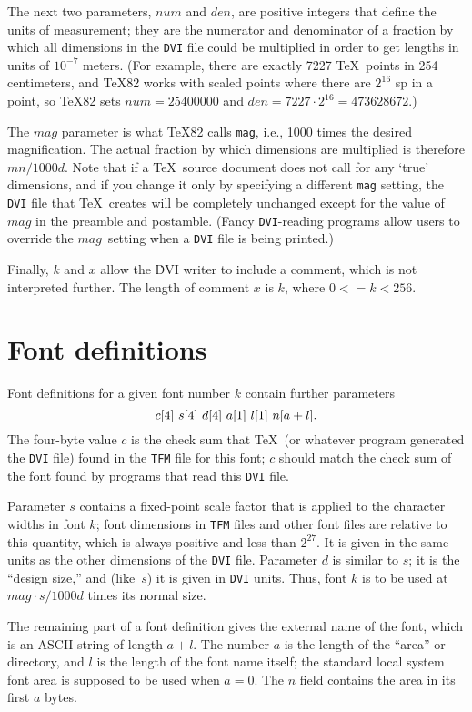 \documentclass[10pt, a4paper]{article}
\begin{document}
The next two parameters, $num$ and $den$, are positive integers that define
the units of measurement; they are the numerator and denominator of a
fraction by which all dimensions in the \texttt{DVI} file could be multiplied
in order to get lengths in units of $10^{-7}$ meters. (For example, there are
exactly 7227 \TeX\ points in 254 centimeters, and \TeX82 works with scaled
points where there are $2^{16}$ sp in a point, so \TeX82 sets $num=25400000$
and $den=7227\cdot2^{16}=473628672$.)


The $mag$ parameter is what \TeX82 calls \texttt{mag}, i.e., 1000 times the
desired magnification. The actual fraction by which dimensions are
multiplied is therefore $mn/1000d$. Note that if a \TeX\ source document
does not call for any `{true}' dimensions, and if you change it only by
specifying a different \texttt{mag} setting, the \texttt{DVI} file that \TeX\
creates will be completely unchanged except for the value of $mag$ in the
preamble and postamble. (Fancy \texttt{DVI}-reading programs allow users to
override the $mag$~setting when a \texttt{DVI} file is being printed.)

Finally, $k$ and $x$ allow the \.{DVI} writer to include a comment, which is not
interpreted further. The length of comment $x$ is $k$, where $0<=k<256$.


\section{Font definitions}
\label{sec:fontDef}

Font definitions for a given font number $k$ contain further parameters
\[
\hbox{$c[4]$ $s[4]$ $d[4]$ $a[1]$ $l[1]$ $n[a+l]$.}
\]
The four-byte value $c$ is the check sum that \TeX\ (or whatever program
generated the \texttt{DVI} file) found in the \texttt{TFM} file for this font;
$c$ should match the check sum of the font found by programs that read
this \texttt{DVI} file.


Parameter $s$ contains a fixed-point scale factor that is applied to the
character widths in font $k$; font dimensions in \texttt{TFM} files and other
font files are relative to this quantity, which is always positive and
less than $2^{27}$. 
It is given in the same units as the other dimensions of the \texttt{DVI} file. 
Parameter $d$ is similar to $s$; it is the ``design size,'' 
and (like~$s$) it is given in \texttt{DVI} units. 
Thus, font $k$ is to be used at $mag\cdot s/1000d$ times its normal size.

The remaining part of a font definition gives the external name of the font,
which is an ASCII string of length $a+l$. The number $a$ is the length
of the ``area'' or directory, and $l$ is the length of the font name itself;
the standard local system font area is supposed to be used when $a=0$.
The $n$ field contains the area in its first $a$ bytes.
\end{document}
